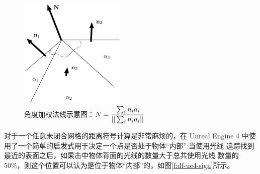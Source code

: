 \begin{figure}
	\sidecaption
	\includegraphics[width=0.45\textwidth]{figures/df/Computing-vertex-normals}
	\caption{角度加权法线示意图：$N=\cfrac{\sum_in_i a_i}{||\sum_in_ia_i||}$}
	\label{f:df-Computing-vertex-normals}
\end{figure}

对于一个任意未闭合网格的距离符号计算是非常麻烦的，在 Unreal Engine 4 中使用了一个简单的启发式用于决定一个点是否处于物体“内部”:当使用光线 追踪找到最近的表面之后，如果击中物体背面的光线的数量大于总共使用光线 数量的 50\%，则这个位置可以认为是位于物体“内部”的，如图\ref{f:df-ue4-sign}所示。

